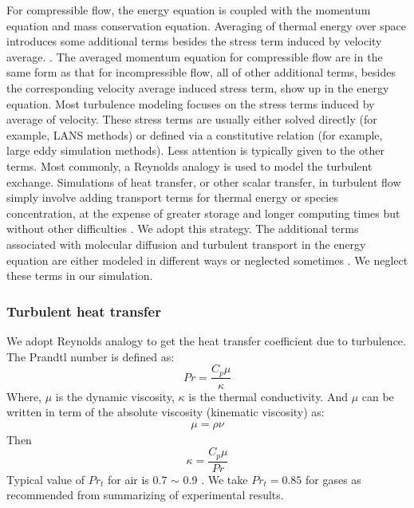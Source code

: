 \documentclass[journal abbreviation, manuscript]{copernicus}
\begin{document}
For compressible flow, the energy equation is coupled with the momentum equation and mass conservation equation. Averaging of thermal energy over space introduces some additional terms besides the stress term induced by velocity average. \citep{NASACompressibleTurbulence}. The averaged momentum equation for compressible flow are in the same form as that for incompressible flow, all of other additional terms, besides the corresponding velocity average induced stress term, show up in the energy equation. Most turbulence modeling focuses on the stress terms induced by average of velocity. These stress terms are usually either solved directly (for example, LANS methods) or defined via a constitutive relation (for example, large eddy simulation methods). Less attention is typically given to the other terms. Most commonly, a Reynolds analogy is used to model the turbulent exchange. Simulations of heat transfer, or other scalar transfer, in turbulent flow simply involve adding transport terms for thermal energy or species concentration, at the expense of greater storage and longer computing times but without other difficulties \citep{cebeci2013analysis}. We adopt this strategy. %
The additional terms associated with molecular diffusion and turbulent transport in the energy equation are either modeled in different ways or neglected sometimes \citep{NASACompressibleTurbulence}. We neglect these terms in our simulation.

\subsubsection{Turbulent heat transfer}
We adopt Reynolds analogy to get the heat transfer coefficient due to turbulence.
The Prandtl number is defined as:
\begin{equation}
Pr=\dfrac{C_p \mu}{\kappa}
\end{equation}
Where, $\mu$ is the dynamic viscosity, $\kappa$ is the thermal conductivity. And $\mu$  can be written in term of the absolute viscosity (kinematic viscosity) as:
\begin{align}
\mu=\rho \nu
\end{align}
Then
\begin{equation}
\kappa=\dfrac{C_p \mu}{Pr}
\end{equation}
Typical value of $Pr_t$ for air is 0.7 $\sim$ 0.9 . We take $Pr_t=0.85$ for gases as recommended \citet{kays1994turbulent} from summarizing of experimental results. 
\end{document}
